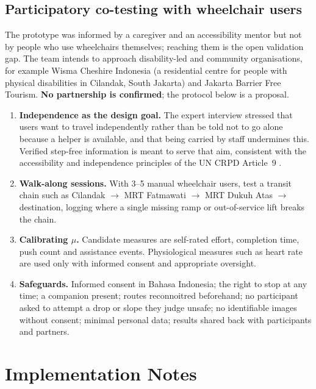 \documentclass[11pt,a4paper]{article}
\begin{document}
\subsection{Participatory co-testing with wheelchair users}\label{sec:cotest}

The prototype was informed by a caregiver and an accessibility mentor but not by people who use
wheelchairs themselves; reaching them is the open validation gap. The team intends to approach
disability-led and community organisations, for example Wisma Cheshire Indonesia (a residential
centre for people with physical disabilities in Cilandak, South Jakarta) and Jakarta Barrier Free
Tourism. \textbf{No partnership is confirmed}; the protocol below is a proposal.

\begin{enumerate}
  \item \textbf{Independence as the design goal.} The expert interview stressed that users want to
    travel independently rather than be told not to go alone because a helper is available, and
    that being carried by staff undermines this. Verified step-free information is meant to serve that aim, consistent with the
    accessibility and independence principles of the UN CRPD Article~9 \cite{uncrpd2006}.
  \item \textbf{Walk-along sessions.} With 3--5 manual wheelchair users, test a transit chain such as
    Cilandak $\rightarrow$ MRT Fatmawati $\rightarrow$ MRT Dukuh Atas $\rightarrow$ destination, logging
    where a single missing ramp or out-of-service lift breaks the chain.
  \item \textbf{Calibrating $\mu$.} Candidate measures are self-rated effort, completion time, push
    count and assistance events. Physiological measures such as heart rate are used only with
    informed consent and appropriate oversight.
  \item \textbf{Safeguards.} Informed consent in Bahasa Indonesia; the right to stop at any time; a
    companion present; routes reconnoitred beforehand; no participant asked to attempt a drop or slope
    they judge unsafe; no identifiable images without consent; minimal personal data; results
    shared back with participants and partners.
\end{enumerate}

\section{Implementation Notes}\label{sec:impl}
\end{document}
